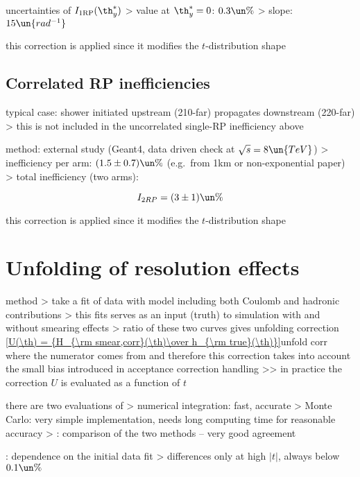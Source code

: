 \> uncertainties of $I_{\rm 1RP}(\th_y^*)$
\>> value at $\th_y^* = 0$: $0.3\un{\%}$
\>> slope: $15\un{rad^{-1}}$

\> this correction is applied since it modifies the $t$-distribution shape


\section[efficiency-correlated]{Correlated RP inefficiencies}

\> typical case: shower initiated upstream (210-far) propagates downstream (220-far)
\>> this is not included in the uncorrelated single-RP inefficiency above

\> method: external study (Geant4, data driven check at $\sqrt s = 8\un{TeV}$)
\>> inefficiency per arm: $(1.5 \pm 0.7)\un{\%}$ (e.g.~from 1km or non-exponential paper)
\>> total inefficiency (two arms):

$$I_{2RP} = (3 \pm 1)\un{\%}$$

\> this correction is applied since it modifies the $t$-distribution shape

\fi



\chapter[unfolding]{Unfolding of resolution effects}

\iffalse

\> method
\>> take a fit of data with model including both Coulomb and hadronic contributions
\>> this fits serves as an input (truth) to simulation with and without smearing effects
\>> ratio of these two curves gives unfolding correction
\eqref{U(\th) = {H_{\rm smear,corr}(\th)\over h_{\rm true}(\th)}}{unfold corr}
where the numerator comes from  and therefore this correction takes into account the small bias introduced in acceptance correction handling
\>>> in practice the correction $U$ is evaluated as a function of $t$

\> there are two evaluations of 
\>> numerical integration: fast, accurate
\>> Monte Carlo: very simple implementation, needs long computing time for reasonable accuracy
\>>  : comparison of the two methods -- very good agreement

\>  : dependence on the initial data fit
\>> differences only at high $|t|$, always below $0.1\un{\%}$

